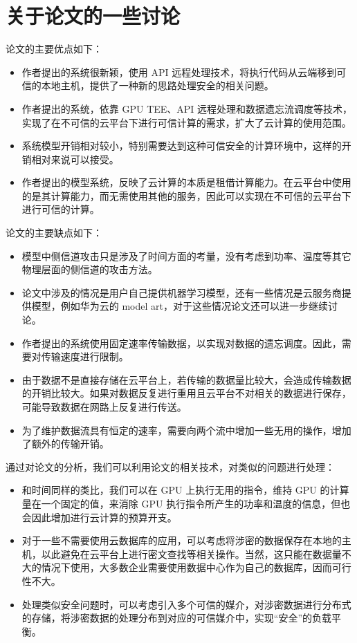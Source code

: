 \documentclass{ctexart}
\begin{document}
\section{关于论文的一些讨论}

论文的主要优点如下：

\begin{itemize}
    \item 作者提出的系统很新颖，使用 API 远程处理技术，将执行代码从云端移到可信的本地主机，提供了一种新的思路处理安全的相关问题。
    \item 作者提出的系统，依靠 GPU TEE、API 远程处理和数据遗忘流调度等技术，实现了在不可信的云平台下进行可信计算的需求，扩大了云计算的使用范围。
    \item 系统模型开销相对较小，特别需要达到这种可信安全的计算环境中，这样的开销相对来说可以接受。
    \item 作者提出的模型系统，反映了云计算的本质是租借计算能力。在云平台中使用的是其计算能力，而无需使用其他的服务，因此可以实现在不可信的云平台下进行可信的计算。
\end{itemize}

论文的主要缺点如下：

\begin{itemize}
    \item 模型中侧信道攻击只是涉及了时间方面的考量，没有考虑到功率、温度等其它物理层面的侧信道的攻击方法。
    \item 论文中涉及的情况是用户自己提供机器学习模型，还有一些情况是云服务商提供模型，例如华为云的 model art，对于这些情况论文还可以进一步继续讨论。
    \item 作者提出的系统使用固定速率传输数据，以实现对数据的遗忘调度。因此，需要对传输速度进行限制。
    \item 由于数据不是直接存储在云平台上，若传输的数据量比较大，会造成传输数据的开销比较大。如果对数据反复进行重用且云平台不对相关的数据进行保存，可能导致数据在网路上反复进行传送。
    \item 为了维护数据流具有恒定的速率，需要向两个流中增加一些无用的操作，增加了额外的传输开销。
\end{itemize}

通过对论文的分析，我们可以利用论文的相关技术，对类似的问题进行处理：

\begin{itemize}
    \item 和时间同样的类比，我们可以在 GPU 上执行无用的指令，维持 GPU 的计算量在一个固定的值，来消除 GPU 执行指令所产生的功率和温度的信息，但也会因此增加进行云计算的预算开支。
    \item 对于一些不需要使用云数据库的应用，可以考虑将涉密的数据保存在本地的主机，以此避免在云平台上进行密文查找等相关操作。当然，这只能在数据量不大的情况下使用，大多数企业需要使用数据中心作为自己的数据库，因而可行性不大。
    \item 处理类似安全问题时，可以考虑引入多个可信的媒介，对涉密数据进行分布式的存储，将涉密数据的处理分布到对应的可信媒介中，实现“安全”的负载平衡。
\end{itemize}


\end{document}
